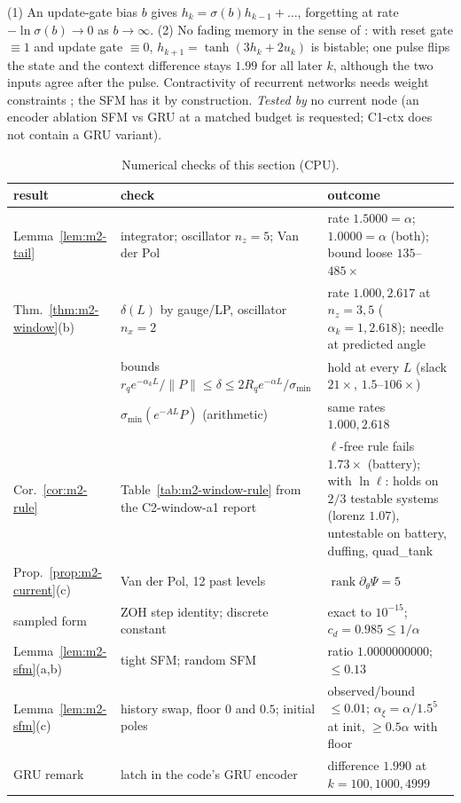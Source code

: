 \begin{remark}
(1) An update-gate bias $b$ gives $h_k=\sigma(b)h_{k-1}+\dots$, forgetting at rate $-\ln\sigma(b)\to0$ as $b\to\infty$.
(2) No fading memory in the sense of \citet{boyd1985fading}: with reset gate $\equiv1$ and update gate $\equiv0$,
$h_{k+1}=\tanh(3h_k+2u_k)$ is bistable; one pulse flips the state and the context difference stays $1.99$ for all
later $k$, although the two inputs agree after the pulse. Contractivity of recurrent networks needs weight
constraints \citep{miller2019stable}; the SFM has it by construction. \emph{Tested by} no current node (an encoder
ablation SFM vs GRU at a matched budget is requested; C1-ctx does not contain a GRU variant).
\end{remark}

\begin{table}[ht]\centering\footnotesize
\caption{Numerical checks of this section (CPU).}\label{tab:m2-checks}
\begin{tabular}{@{}lp{4.6cm}p{7.4cm}@{}}\hline
result & check & outcome\\\hline
Lemma~\ref{lem:m2-tail} & integrator; oscillator $n_z=5$; Van der Pol & rate $1.5000=\alpha$; $1.0000=\alpha$ (both); bound loose $135$--$485\times$\\
Thm.~\ref{thm:m2-window}(b) & $\delta(L)$ by gauge/LP, oscillator $n_x=2$ & rate $1.000,2.617$ at $n_z=3,5$ ($\alpha_k=1,2.618$); needle at predicted angle\\
 & bounds $r_qe^{-\alpha_kL}/\|P\|\le\delta\le2R_qe^{-\alpha L}/\sigma_{\min}$ & hold at every $L$ (slack $21\times$, $1.5$--$106\times$)\\
 & $\sigma_{\min}(e^{-AL}P)$ (arithmetic) & same rates $1.000,2.618$\\
Cor.~\ref{cor:m2-rule} & Table~\ref{tab:m2-window-rule} from the C2-window-a1 report & $\ell$-free rule fails $1.73\times$ (battery); with $\ln\ell$: holds on $2/3$ testable systems (lorenz $1.07$), untestable on battery, duffing, quad\_tank\\
Prop.~\ref{prop:m2-current}(c) & Van der Pol, 12 past levels & $\operatorname{rank}\partial_\theta\Psi=5$\\
sampled form & ZOH step identity; discrete constant & exact to $10^{-15}$; $c_d=0.985\le1/\alpha$\\
Lemma~\ref{lem:m2-sfm}(a,b) & tight SFM; random SFM & ratio $1.0000000000$; $\le0.13$\\
Lemma~\ref{lem:m2-sfm}(c) & history swap, floor $0$ and $0.5$; initial poles & observed/bound $\le0.01$; $\alpha_\xi=\alpha/1.5^5$ at init, $\ge0.5\alpha$ with floor\\
GRU remark & latch in the code's GRU encoder & difference $1.990$ at $k=100,1000,4999$\\\hline
\end{tabular}
\end{table}

